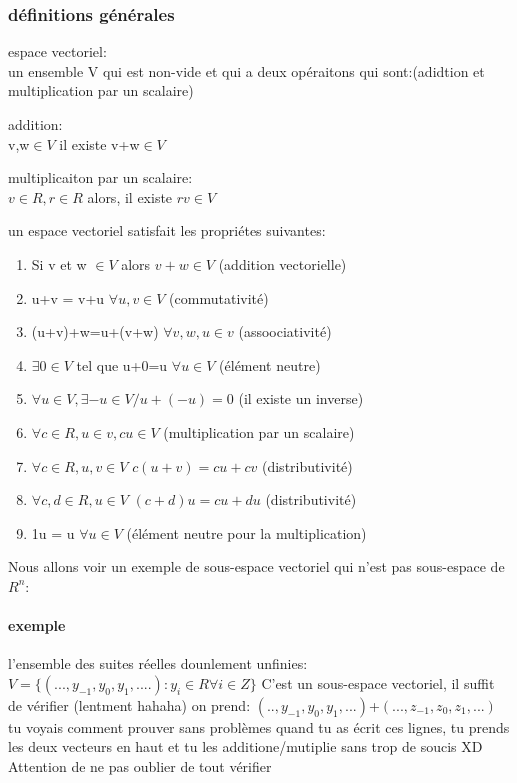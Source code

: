 \documentclass[a4paper,10pt]{article}
\begin{document}
\subsubsection{définitions générales}
\begin{description}
 \item espace vectoriel:\\{un ensemble V qui est non-vide et qui a deux opéraitons qui sont:(adidtion et multiplication par un scalaire)}
 \item addition:\\{v,w$\in V$ il existe v+w$\in V$}
 \item multiplicaiton par un scalaire:\\{$v\in R,r\in R$ alors, il existe $rv\in V$}
\end{description}
un espace vectoriel satisfait les propriétes suivantes:
\begin{enumerate}
 \item Si v et w $\in V$ alors $v+w\in V$ (addition vectorielle)
 \item u+v = v+u $\forall u,v\in V$ (commutativité)
 \item (u+v)+w=u+(v+w) $\forall v,w,u\in v$ (assoociativité)
 \item $\exists 0\in V$ tel que u+0=u $\forall u\in V$ (élément neutre)
 \item $\forall u\in V,\exists -u\in V/u+(-u)=0$ (il existe un inverse)
 \item $\forall c\in R, u\in v, cu\in V$ (multiplication par un scalaire)
 \item $\forall c\in R,u,v\in V$ $c(u+v)= cu +cv$ (distributivité)
 \item $\forall c,d\in R, u\in V$ $ (c+d)u=cu+du$ (distributivité)
 \item 1u = u $\forall u\in V$ (élément neutre pour la multiplication)
\end{enumerate}
Nous allons voir un exemple de sous-espace vectoriel qui n'est pas sous-espace de $R^n$:
\paragraph{exemple}
l'ensemble des suites réelles dounlement unfinies:
\newline
$V=\{(...,y_{-1},y_0,y_1,....):y_i\in R\forall i\in Z\}$
\newline
C'est un sous-espace vectoriel, il suffit de vérifier (lentment hahaha)
\newline
on prend:
\newline
$(..,y_{-1},y_0,y_1,...)$+$(...,z_{-1},z_0,z_{1},...)$
\newline
tu voyais comment prouver sans problèmes quand tu as écrit ces lignes, tu prends les deux vecteurs en haut et tu les additione/mutiplie sans trop de soucis XD
\newline
Attention de ne pas oublier de tout vérifier
\end{document}
